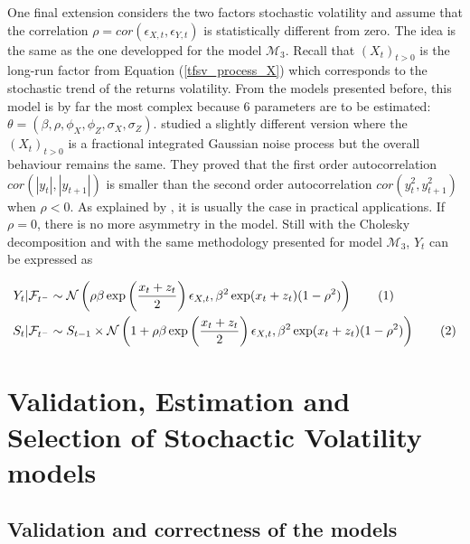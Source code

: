 \documentclass[11pt,a4,twosided,singlespacing,titlepagenumber=on]{scrreprt}
\numberwithin{equation}{chapter} %
\theoremstyle{remark}
\newcommand\numberthis{\addtocounter{equation}{1}\tag{\theequation}}
\begin{document}
One final extension considers the two factors stochastic volatility and assume that the correlation $\rho = cor(\epsilon_{X,t}, \epsilon_{Y,t})$ is statistically different from zero. The idea is the same as the one developped for the model $\mathcal{M}_3$. Recall that $(X_t)_{t>0}$ is the long-run factor from Equation (\ref{tfsv_process_X}) which corresponds to the stochastic trend of the returns volatility. From the models presented before, this model is by far the most complex because 6 parameters are to be estimated: $\theta = (\beta, \rho, \phi_X, \phi_Z, \sigma_X, \sigma_Z)$. \cite{ruiz2008} studied a slightly different version where the $(X_t)_{t>0}$ is a fractional integrated Gaussian noise process but the overall behaviour remains the same. They proved that the first order autocorrelation $cor(|y_t|,|y_{t+1}|)$ is smaller than the second order autocorrelation $cor(y_t^2,y_{t+1}^2)$ when $\rho < 0$. As explained by \cite{cont2005}, it is usually the case in practical applications. If $\rho = 0$, there is no more asymmetry in the model. Still with the Cholesky decomposition and with the same methodology presented for model $\mathcal{M}_3$, $Y_t$ can be expressed as

\begin{align*}
Y_t | \mathcal{F}_{t^-}            &\sim \mathcal{N}\left(\rho \beta \exp \left(\frac{x_t + z_t}{2} \right) \epsilon_{X,t}, \beta^2 \exp(x_t + z_t) (1-\rho^2)\right) \numberthis \\
S_t | \mathcal{F}_{t^-}   &\sim S_{t-1} \times \mathcal{N}\left(1 + \rho \beta \exp \left(\frac{x_t + z_t}{2} \right) \epsilon_{X,t}, \beta^2 \exp(x_t + z_t) (1-\rho^2)\right) \numberthis
\end{align*}

\chapter{Validation, Estimation and Selection of Stochactic Volatility models}

\section{Validation and correctness of the models}
\end{document}
